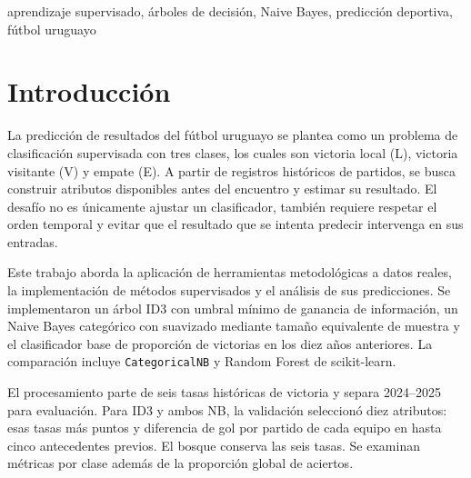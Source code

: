 \documentclass[conference]{IEEEtran}
\begin{document}
\begin{abstract}
Se estudia la predicción de victoria local, visitante o empate mediante atributos históricos causales y validación temporal. Se usan 14.705 partidos hasta 2023 para entrenamiento y 472 de 2024--2025 para evaluación. La validación anual 2021--2023 selecciona diez entradas para ID3 y ambos Naive Bayes, y seis para Random Forest. En la evaluación final, Naive Bayes obtiene accuracy 0,4788 y macro-F1 0,4454; ID3, 0,4492 y 0,4238; Random Forest, 0,4258 y 0,4219; y el baseline de diez años, 0,4619 y 0,3564. Los dos NB producen las mismas 472 clases predichas. La principal dificultad compartida es reconocer empates; se analizan los errores y las limitaciones del diseño experimental.
\end{abstract}

\begin{IEEEkeywords}
aprendizaje supervisado, árboles de decisión, Naive Bayes, predicción deportiva, fútbol uruguayo
\end{IEEEkeywords}

\section{Introducción}
La predicción de resultados del fútbol uruguayo se plantea como un problema de clasificación supervisada con tres clases, los cuales son victoria local (L), victoria visitante (V) y empate (E). A partir de registros históricos de partidos, se busca construir atributos disponibles antes del encuentro y estimar su resultado. El desafío no es únicamente ajustar un clasificador, también requiere respetar el orden temporal y evitar que el resultado que se intenta predecir intervenga en sus entradas.

Este trabajo aborda la aplicación de herramientas metodológicas a datos reales, la implementación de métodos supervisados y el análisis de sus predicciones. Se implementaron un árbol ID3 con umbral mínimo de ganancia de información, un Naive Bayes categórico con suavizado mediante tamaño equivalente de muestra y el clasificador base de proporción de victorias en los diez años anteriores. La comparación incluye \texttt{CategoricalNB} y Random Forest de scikit-learn.

El procesamiento parte de seis tasas históricas de victoria y separa 2024--2025 para evaluación. Para ID3 y ambos NB, la validación seleccionó diez atributos: esas tasas más puntos y diferencia de gol por partido de cada equipo en hasta cinco antecedentes previos. El bosque conserva las seis tasas. Se examinan métricas por clase además de la proporción global de aciertos.
\end{document}
